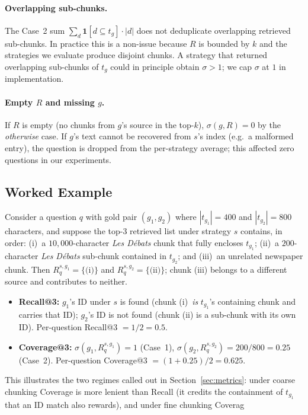 \paragraph{Overlapping sub-chunks.} The Case~2 sum
$\sum_{d}\mathbf{1}[d \subseteq t_g]\cdot|d|$ does not deduplicate
overlapping retrieved sub-chunks. In practice this is a non-issue
because $R$ is bounded by $k$ and the strategies we evaluate produce
disjoint chunks. A strategy that returned overlapping sub-chunks of
$t_g$ could in principle obtain $\sigma > 1$; we cap $\sigma$ at $1$
in implementation.

\paragraph{Empty $R$ and missing $g$.} If $R$ is empty (no chunks
from $g$'s source in the top-$k$), $\sigma(g, R) = 0$ by the
\emph{otherwise} case. If $g$'s text cannot be recovered from $s$'s
index (e.g.\ a malformed entry), the question is dropped from the
per-strategy average; this affected zero questions in our experiments.

\subsection{Worked Example}
\label{sec:appendix-metrics-example}

Consider a question $q$ with gold pair $(g_1, g_2)$ where
$|t_{g_1}|{=}400$ and $|t_{g_2}|{=}800$ characters, and suppose the
top-3 retrieved list under strategy $s$ contains, in order: (i)~a
$10{,}000$-character \textit{Les D\'ebats} chunk that fully encloses
$t_{g_1}$; (ii)~a $200$-character \textit{Les D\'ebats} sub-chunk
contained in $t_{g_2}$; and (iii)~an unrelated newspaper chunk. Then
$R_q^{s, g_1} = \{\text{(i)}\}$ and $R_q^{s, g_2} = \{\text{(ii)}\}$;
chunk (iii) belongs to a different source and contributes to neither.

\begin{itemize}[leftmargin=1.2em,itemsep=0.15em,topsep=0.2em]
  \item \textbf{Recall@3:} $g_1$'s ID under $s$ is found (chunk
  (i)~\emph{is} $t_{g_1}$'s containing chunk and carries that ID);
  $g_2$'s ID is not found (chunk (ii) is a sub-chunk with its own
  ID). Per-question Recall@3 $= 1/2 = 0.5$.
  \item \textbf{Coverage@3:} $\sigma(g_1, R_q^{s, g_1}) = 1$
  (Case~1), $\sigma(g_2, R_q^{s, g_2}) = 200/800 = 0.25$ (Case~2).
  Per-question Coverage@3 $= (1 + 0.25)/2 = 0.625$.
\end{itemize}

This illustrates the two regimes called out in
Section~\ref{sec:metrics}: under coarse chunking Coverage is more
lenient than Recall (it credits the containment of $t_{g_1}$ that an
ID match also rewards), and under fine chunking Coverag